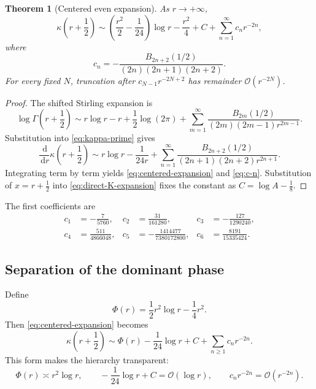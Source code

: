 \documentclass[11pt,a4paper]{article}
\numberwithin{equation}{section}
\newtheorem{theorem}{Theorem}[section]
\theoremstyle{remark}
\newcommand{\bigO}{\mathcal O}
\newcommand{\dd}{\,\mathrm d}
\begin{document}
\begin{theorem}[Centered even expansion]
\label{thm:centered-expansion}
As \(r\to+\infty\),
\begin{equation}
\kappa\!\left(r+\frac12\right)
\sim \left(\frac{r^2}{2}-\frac1{24}\right)\log r
-\frac{r^2}{4}+C+
\sum_{n=1}^{\infty}c_n r^{-2n},
\label{eq:centered-expansion}
\end{equation}
where
\begin{equation}
c_n=-\frac{B_{2n+2}(1/2)}{(2n)(2n+1)(2n+2)}.
\label{eq:c-n}
\end{equation}
For every fixed \(N\), truncation after \(c_{N-1}r^{-2N+2}\) has remainder
\(\bigO(r^{-2N})\).
\end{theorem}

\begin{proof}
The shifted Stirling expansion is
\begin{equation}
\log\Gamma\!\left(r+\frac12\right)
\sim r\log r-r+\frac12\log(2\pi)
+\sum_{m=1}^{\infty}
\frac{B_{2m}(1/2)}{(2m)(2m-1)r^{2m-1}}.
\label{eq:shifted-stirling}
\end{equation}
Substitution into \cref{eq:kappa-prime} gives
\[
\frac{\dd}{\dd r}\kappa\!\left(r+\frac12\right)
\sim r\log r-\frac{1}{24r}
+\sum_{n=1}^{\infty}
\frac{B_{2n+2}(1/2)}{(2n+1)(2n+2)r^{2n+1}}.
\]
Integrating term by term yields \cref{eq:centered-expansion} and
\cref{eq:c-n}.  Substitution of \(x=r+\tfrac12\) into
\cref{eq:direct-K-expansion} fixes the constant as
\(C=\log A-\tfrac18\).
\end{proof}

The first coefficients are
\begin{equation}
\begin{aligned}
c_1&=-\frac7{5760},&
 c_2&=\frac{31}{161280},&
 c_3&=-\frac{127}{1290240},\\
c_4&=\frac{511}{4866048},&
 c_5&=-\frac{1414477}{7380172800},&
 c_6&=\frac{8191}{15335424}.
\end{aligned}
\label{eq:c-first}
\end{equation}

\subsection{Separation of the dominant phase}

Define
\begin{equation}
\Phi(r)=\frac12r^2\log r-\frac14r^2.
\label{eq:Phi}
\end{equation}
Then \cref{eq:centered-expansion} becomes
\begin{equation}
\kappa\!\left(r+\frac12\right)
\sim \Phi(r)-\frac1{24}\log r+C+
\sum_{n\ge1}c_n r^{-2n}.
\label{eq:centered-Phi}
\end{equation}
This form makes the hierarchy transparent:
\[
\Phi(r)\asymp r^2\log r,
\qquad -\frac1{24}\log r+C=\bigO(\log r),
\qquad c_n r^{-2n}=\bigO(r^{-2n}).
\]
\end{document}
